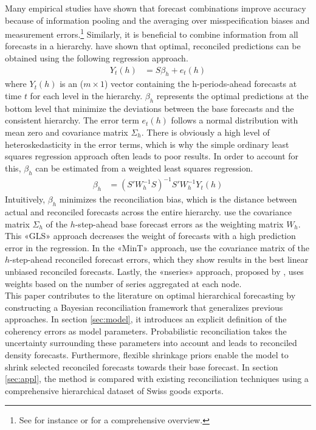 \documentclass[a4paper,fleqn,11pt]{article}
\begin{document}
Many empirical studies have shown that forecast combinations improve accuracy because of information pooling and the averaging over misspecification biases and measurement errors.\footnote{See for instance \cite{Timmermann2006} or \cite{Watson2004} for a comprehensive overview.} Similarly, it is beneficial to combine information from all forecasts in a hierarchy. \cite{Hyndman2011} have shown that optimal, reconciled predictions can be obtained using the following regression approach.
\begin{align}
Y_t(h) &= S\beta_{h} + e_t(h)
\end{align}
where $Y_t(h)$ is an ($m \times 1$) vector containing the h-periods-ahead forecasts at time $t$ for each level in the hierarchy. $\beta_{h}$ represents the optimal predictions at the bottom level that minimize the deviations between the base forecasts and the consistent hierarchy. The error term $e_t(h)$ follows a normal distribution with mean zero and covariance matrix $\Sigma_h$. There is obviously a high level of heteroskedasticity in the error terms, which is why the simple ordinary least squares regression approach often leads to poor results. In order to account for this, $\beta_h$ can be estimated from a weighted least squares regression.
\begin{align}
\label{eq:reg}
\beta_{h} &= \left(S'W_h^{-1}S \right)^{-1} S'W_h^{-1}Y_t(h)
\end{align}
Intuitively, $\beta_h$ minimizes the reconciliation bias, which is the distance between actual and reconciled forecasts across the entire hierarchy. \cite{Hyndman2016} use the covariance matrix $\Sigma_h$ of the $h$-step-ahead base forecast errors as the weighting matrix $W_h$. This «GLS» approach decreases the weight of forecasts with a high prediction error in the regression. In the «MinT» approach, \cite{Wickramasuriya2015} use the covariance matrix of the $h$-step-ahead reconciled forecast errors, which they show results in the best linear unbiased reconciled forecasts. Lastly, the «nseries» approach, proposed by \cite{Athanasopoulos2017}, uses weights based on the number of series aggregated at each node.\\

This paper contributes to the literature on optimal hierarchical forecasting by constructing a Bayesian reconciliation framework that generalizes previous approaches. In section \ref{sec:model}, it introduces an explicit definition of the coherency errors as model parameters. Probabilistic reconciliation takes the uncertainty surrounding these parameters into account and leads to reconciled density forecasts. Furthermore, flexible shrinkage priors enable the model to shrink selected reconciled forecasts towards their base forecast. In section \ref{sec:appl}, the method is compared with existing reconciliation techniques using a comprehensive hierarchical dataset of Swiss goods exports.
\end{document}
